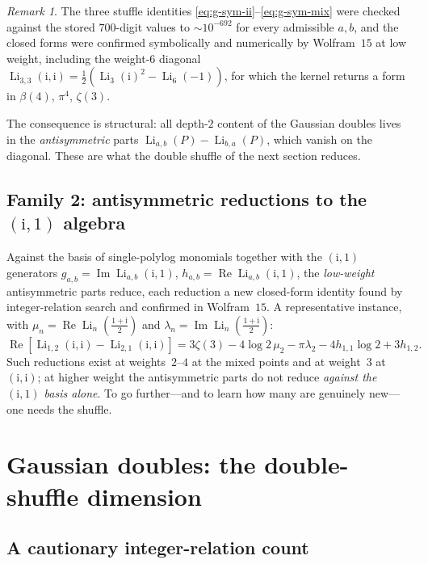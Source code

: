 \documentclass[11pt]{article}
\DeclareMathOperator{\Li}{Li}
\DeclareMathOperator{\Real}{Re}
\DeclareMathOperator{\Imag}{Im}
\newcommand{\iu}{\mathrm{i}}
\theoremstyle{plain}
\theoremstyle{remark}
\newtheorem{remark}[theorem]{Remark}
\begin{document}
\begin{remark}
The three stuffle identities \eqref{eq:g-sym-ii}--\eqref{eq:g-sym-mix} were checked against the stored
$700$-digit values to ${\sim}10^{-692}$ for every admissible $a,b$, and the closed forms were
confirmed symbolically and numerically by Wolfram~$15$ at low weight, including the weight-$6$
diagonal $\Li_{3,3}(\iu,\iu)=\tfrac12(\Li_3(\iu)^2-\Li_6(-1))$, for which the kernel returns a form in
$\beta(4)$, $\pi^4$, $\zeta(3)$.
\end{remark}

The consequence is structural: all depth-$2$ content of the Gaussian doubles lives in the
\emph{antisymmetric} parts $\Li_{a,b}(P)-\Li_{b,a}(P)$, which vanish on the diagonal. These are what
the double shuffle of the next section reduces.

\subsection{Family 2: antisymmetric reductions to the $(\iu,1)$ algebra}

Against the basis of single-polylog monomials together with the $(\iu,1)$ generators
$g_{a,b}=\Imag\Li_{a,b}(\iu,1)$, $h_{a,b}=\Real\Li_{a,b}(\iu,1)$, the \emph{low-weight} antisymmetric
parts reduce, each reduction a new closed-form identity found by integer-relation search and confirmed
in Wolfram~$15$. A representative instance, with $\mu_n=\Real\Li_n(\tfrac{1+\iu}2)$ and
$\lambda_n=\Imag\Li_n(\tfrac{1+\iu}2)$:
\begin{equation}\label{eq:fam2-example}
  \Real\!\left[\Li_{1,2}(\iu,\iu)-\Li_{2,1}(\iu,\iu)\right]
  =3\zeta(3)-4\log2\,\mu_2-\pi\lambda_2-4h_{1,1}\log2+3h_{1,2}.
\end{equation}
Such reductions exist at weights~$2$--$4$ at the mixed points and at weight~$3$ at $(\iu,\iu)$; at
higher weight the antisymmetric parts do not reduce \emph{against the $(\iu,1)$ basis alone}. To go
further---and to learn how many are genuinely new---one needs the shuffle.

\section{Gaussian doubles: the double-shuffle dimension}\label{sec:gauss-frontier}

\subsection{A cautionary integer-relation count}
\end{document}
